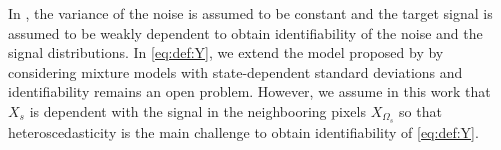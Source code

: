 \documentclass[lettersize,journal]{IEEEtran}
\begin{document}
In \cite{gassiat:lecorff:lehericy:2021}, the variance of the noise is assumed to be constant and the target signal is assumed to be weakly dependent to obtain identifiability of the noise and the signal  distributions. %
In \eqref{eq:def:Y}, we extend the model  proposed by \cite{gassiat:lecorff:lehericy:2021} by considering mixture models with  state-dependent standard deviations and identifiability remains an open problem. However, we assume in this work that $X_s$ is dependent with the signal in the neighbooring pixels $X_{\Omega_s}$ so that heteroscedasticity is the main challenge to obtain identifiability of \eqref{eq:def:Y}. %
%
\end{document}
